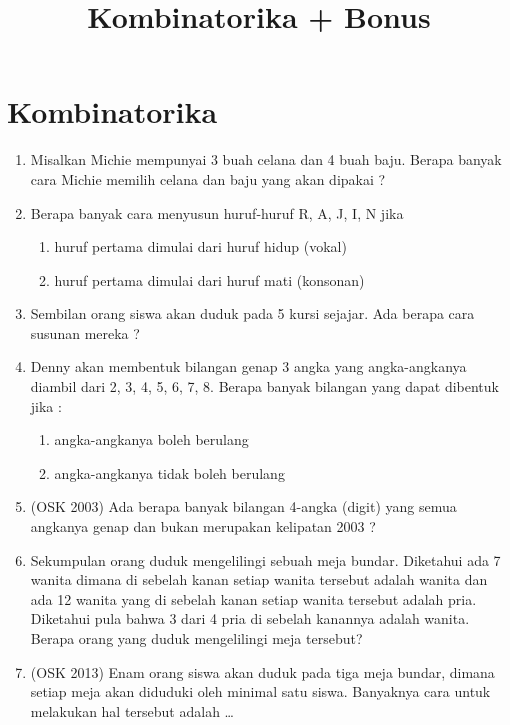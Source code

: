 \documentclass[12pt]{scrartcl}
\title{Kombinatorika + Bonus}
\begin{document}
\renewcommand*\contentsname{Daftar Isi}
\tableofcontents

\newpage
\section{Kombinatorika}
\begin{enumerate}
    \item Misalkan Michie mempunyai 3 buah celana dan 4 buah baju. Berapa banyak cara Michie memilih celana dan baju yang akan dipakai ?

    \item Berapa banyak cara menyusun huruf-huruf R, A, J, I, N jika 
    \begin{enumerate}
        \item huruf pertama dimulai dari huruf hidup (vokal) 
        \item huruf pertama dimulai dari huruf mati (konsonan) 
    \end{enumerate}

    \item Sembilan orang siswa akan duduk pada 5 kursi sejajar. Ada berapa cara susunan mereka ? 
    
    \item Denny akan membentuk bilangan genap 3 angka yang angka-angkanya diambil dari 2, 3, 4, 5, 6, 7, 8. Berapa banyak bilangan yang dapat dibentuk jika : 
    \begin{enumerate}
        \item angka-angkanya boleh berulang 
        \item angka-angkanya tidak boleh berulang
    \end{enumerate}

    \item (OSK 2003) Ada berapa banyak bilangan 4-angka (digit) yang semua angkanya genap dan bukan merupakan kelipatan 2003 ?

    \item Sekumpulan orang duduk mengelilingi sebuah meja bundar. Diketahui ada 7 wanita dimana di sebelah kanan setiap wanita tersebut adalah wanita dan ada 12 wanita yang di sebelah kanan setiap wanita tersebut adalah pria. Diketahui pula bahwa 3 dari 4 pria di sebelah kanannya adalah wanita. Berapa orang yang duduk mengelilingi meja tersebut?

    \item (OSK 2013) Enam orang siswa akan duduk pada tiga meja bundar, dimana setiap meja akan diduduki oleh minimal satu siswa. Banyaknya cara untuk melakukan hal tersebut adalah \ldots


\end{enumerate}
\end{document}

